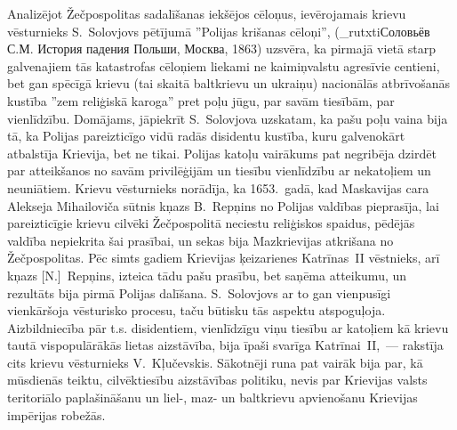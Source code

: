\documentclass[twoside,a5paper,12pt,fleqn,openany]{extbook}
\begin{document}
Analizējot Žečpospolitas sadalīšanas iekšējos cēloņus, ievērojamais krievu vēsturnieks S.~Solovjovs pētījumā ''Polijas krišanas cēloņi'', (\_rutxti{Соловьёв С.М. История падения Польши, Москва, 1863}) uzsvēra, ka pirmajā vietā starp galvenajiem tās katastrofas cēloņiem liekami ne kaimiņvalstu agresīvie centieni, bet gan spēcīgā krievu (tai skaitā baltkrievu un ukraiņu) nacionālās atbrīvošanās kustība ''zem reliģiskā karoga'' pret poļu jūgu, par savām tiesībām, par vienlīdzību. Domājams, jāpiekrīt S.~Solovjova uzskatam, ka pašu poļu vaina bija tā, ka Polijas pareizticīgo vidū radās disidentu kustība, kuru galvenokārt atbalstīja Krievija, bet ne tikai. Polijas katoļu vairākums pat negribēja dzirdēt par atteikšanos no savām privilēģijām un tiesību vienlīdzību ar nekatoļiem un neuniātiem. Krievu vēsturnieks norādīja, ka 1653.~gadā, kad Maskavijas cara Alekseja Mihailoviča sūtnis kņazs B.~Repņins no Polijas valdības pieprasīja, lai pareizticīgie krievu cilvēki Žečpospolitā neciestu reliģiskos spaidus, pēdējās valdība nepiekrita šai prasībai, un sekas bija Mazkrievijas atkrišana no Žečpospolitas. Pēc simts gadiem Krievijas ķeizarienes Katrīnas~II vēstnieks, arī kņazs [N.]~Repņins, izteica tādu pašu prasību, bet saņēma atteikumu, un rezultāts bija pirmā Polijas dalīšana. S.~Solovjovs ar to gan vienpusīgi vienkāršoja vēsturisko procesu, taču būtisku tās aspektu atspoguļoja. Aizbildniecība pār t.s. disidentiem, vienlīdzīgu viņu tiesību ar katoļiem kā krievu tautā vispopulārākās lietas aizstāvība, bija īpaši svarīga Katrīnai~II,~--- rakstīja cits krievu vēsturnieks V.~Kļučevskis. Sākotnēji runa pat vairāk bija par, kā mūsdienās teiktu, cilvēktiesību aizstāvības politiku, nevis par Krievijas valsts teritoriālo paplašināšanu un liel-, maz- un baltkrievu apvienošanu Krievijas impērijas robežās.
\end{document}
